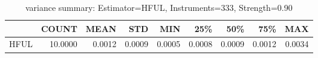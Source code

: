 \begin{table}[ht]
\centering
\caption{variance summary: Estimator=HFUL, Instruments=333, Strength=0.90}
\begin{tabular}{lrrrrrrrr}
\toprule
 & COUNT & MEAN & STD & MIN & 25\% & 50\% & 75\% & MAX \\
\midrule
HFUL & 10.0000 & 0.0012 & 0.0009 & 0.0005 & 0.0008 & 0.0009 & 0.0012 & 0.0034 \\
\bottomrule
\end{tabular}
\end{table}
